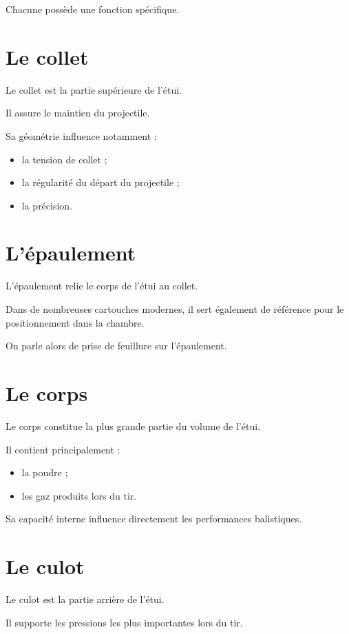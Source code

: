 Chacune possède une fonction spécifique.

\section{Le collet}

Le collet est la partie supérieure de l'étui.

Il assure le maintien du projectile.

Sa géométrie influence notamment :

\begin{itemize}
    \item la tension de collet ;
    \item la régularité du départ du projectile ;
    \item la précision.
\end{itemize}

\section{L'épaulement}

L'épaulement relie le corps de l'étui au collet.

Dans de nombreuses cartouches modernes, il sert également de référence pour
le positionnement dans la chambre.

On parle alors de prise de feuillure sur l'épaulement.

\section{Le corps}

Le corps constitue la plus grande partie du volume de l'étui.

Il contient principalement :

\begin{itemize}
    \item la poudre ;
    \item les gaz produits lors du tir.
\end{itemize}

Sa capacité interne influence directement les performances balistiques.

\section{Le culot}

Le culot est la partie arrière de l'étui.

Il supporte les pressions les plus importantes lors du tir.


